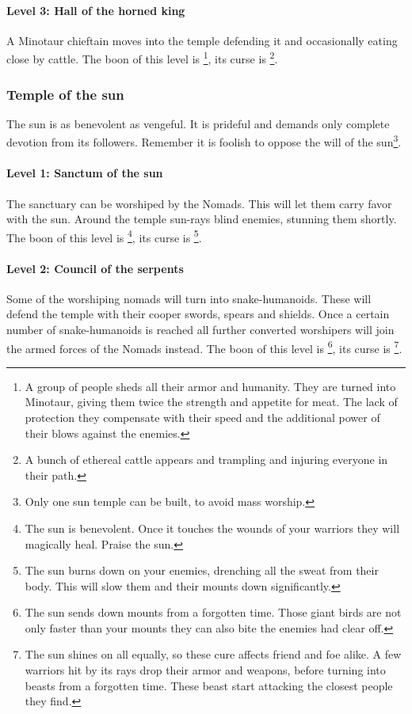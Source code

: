 \documentclass[a4paper]{book}
\begin{document}
			\paragraph{Level 3: Hall of the horned king}
				A Minotaur chieftain moves into the temple defending it
				and occasionally eating close by cattle.
				The boon of this level is \footnote{
					A group of people sheds all their armor and humanity.
					They are turned into Minotaur, giving them twice the strength
					and appetite for meat.
					The lack of protection they compensate with their speed and the additional
					power of their blows against the enemies.
				},
				its curse is \footnote{
					A bunch of ethereal cattle appears and trampling and injuring everyone in their path.
				}.

		\subsubsection{Temple of the sun}
			The sun is as benevolent as vengeful.
			It is prideful and demands only complete devotion from its followers.
			Remember it is foolish to oppose the will of the sun\footnote{
				Only one sun temple can be built, to avoid mass worship.
			}.

			\paragraph{Level 1: Sanctum of the sun}
				The sanctuary can be worshiped by the \gls{Nomads}.
				This will let them carry favor with the sun.
				Around the temple sun-rays blind enemies, stunning them shortly.
				The boon of this level is \footnote{
					The sun is benevolent.
					Once it touches the wounds of your warriors they will magically heal.
					Praise the sun.
				},
				its curse is \footnote{
					The sun burns down on your enemies, drenching all the sweat from their body.
					This will slow them and their mounts down significantly.
				}.

			\paragraph{Level 2: Council of the serpents}
				Some of the worshiping nomads will turn into snake-humanoids.
				These will defend the temple with their cooper swords, spears and shields.
				Once a certain number of snake-humanoids is reached all further converted
				worshipers will join the armed forces of the \gls{Nomads} instead.
				The boon of this level is \footnote{
					The sun sends down mounts from a forgotten time.
					Those giant birds are not only faster than your mounts
					they can also bite the enemies had clear off.
				},
				its curse is \footnote{
					The sun shines on all equally, so these cure affects friend and foe alike.
					A few warriors hit by its rays drop their armor and weapons,
					before turning into beasts from a forgotten time.
					These beast start attacking the closest people they find.
				}.
\end{document}
